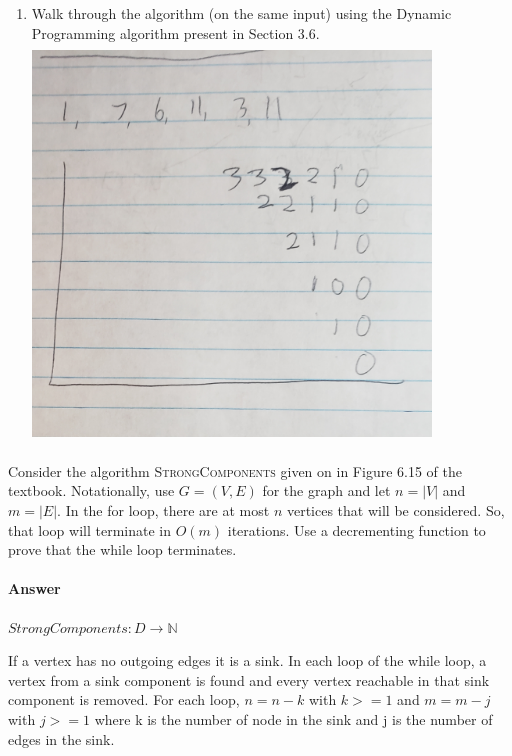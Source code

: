 \documentclass{article}
\begin{document}
\begin{enumerate}
    \item
        Walk through the algorithm (on the same input) using the Dynamic Programming algorithm
        present in Section 3.6.\\
        \includegraphics[width=400,height=400,keepaspectratio]{DynamicLIS.jpg}

\end{enumerate}

\collab{}

Consider the algorithm \textsc{StrongComponents} given on in Figure 6.15 of the
textbook. Notationally, use $G=(V,E)$ for the graph and let $n=|V|$ and $m=|E|$.
In the for loop, there are at most $n$ vertices that will be
considered. So, that loop will terminate in $O(m)$ iterations.
Use a decrementing function to prove that the while loop terminates.

\paragraph{Answer}

$StrongComponents: D \rightarrow \mathbb{N}$

If a vertex has no outgoing edges it is a sink. In each loop of the while loop,
a vertex from a sink component is found and every vertex reachable in that sink
component is removed. For each loop, $n = n - k$ with $k >= 1$ and $m= m -j$ with $j >= 1$ where k is the number of node in the sink and j is the number of edges in the sink.
\end{document}
